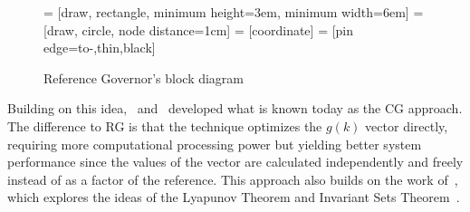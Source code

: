 \begin{figure}
  \centering
      = [draw, rectangle, minimum height=3em, minimum width=6em]
        = [draw, circle, node distance=1cm]
      = [coordinate]
   = [pin edge={to-,thin,black}]
  \caption{Reference Governor's block diagram}%
  \label{fig:rg-block-diagram}
\end{figure}

Building on this idea,~\textcite{bemporad.casavola.ea:nonlinear}
and~\textcite{casavola.mosca.ea:robust} developed what is known today as the
\ac{CG} approach. The difference to RG is that the \CG{} technique optimizes the
\(g(k)\) vector directly, requiring more computational processing power but
yielding better system performance since the values of the vector are calculated
independently and freely instead of as a factor of the reference. This approach
also builds on the work of~\textcite{kapasouris.athans.ea:design}, which
explores the ideas of the Lyapunov Theorem and Invariant Sets
Theorem~\parencite{blanchini.miani:set-theoretic}.

